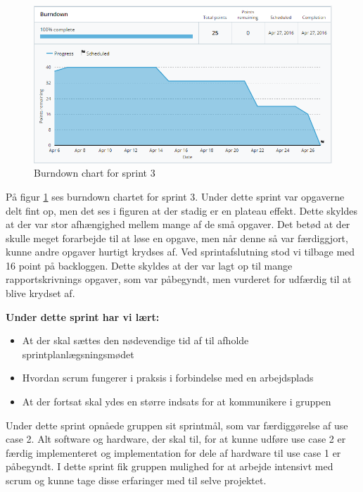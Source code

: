 	\begin{figure}[H]
		\centering
		\includegraphics[width=\textwidth]{Projektgennemfoerelse/images/burndown3}
		\caption{Burndown chart for sprint 3}
		\label{ref:Burndown3}
	\end{figure}
	
	På figur \ref{ref:Burndown3} ses burndown chartet for sprint 3. Under dette sprint var opgaverne delt fint op, men det ses i figuren at der stadig er en plateau effekt. Dette skyldes at der var stor afhængighed mellem mange af de små opgaver. Det betød at der skulle meget forarbejde til at løse en opgave, men når denne så var færdiggjort, kunne andre opgaver hurtigt krydses af. Ved sprintafslutning stod vi tilbage med 16 point på backloggen. Dette skyldes at der var lagt op til mange rapportskrivnings opgaver, som var påbegyndt, men vurderet for udfærdig til at blive krydset af. \newline
	
	\textbf{Under dette sprint har vi lært:}
	\begin{itemize}
		\item At der skal sættes den nødevendige tid af til afholde sprintplanlægsningsmødet
		\item Hvordan scrum fungerer i praksis i forbindelse med en arbejdsplads
		\item At der fortsat skal ydes en større indsats for at kommunikere i gruppen
	\end{itemize}
	
	Under dette sprint opnåede gruppen sit sprintmål, som var færdiggørelse af use case 2. Alt software og hardware, der skal til, for at kunne udføre use case 2 er færdig implementeret og implementation for dele af hardware til use case 1 er påbegyndt. I dette sprint fik gruppen mulighed for at arbejde intensivt med scrum og kunne tage disse erfaringer med til selve projektet. 

